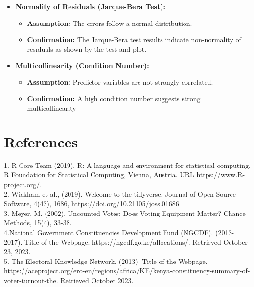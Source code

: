 \documentclass[fleqn,a4paper,12pt]{article}
\begin{document}
\begin{itemize}
\item \textbf{Normality of Residuals (Jarque-Bera Test):}
   \begin{itemize}
   \item \textbf{Assumption:} The errors follow a normal distribution.
   \item \textbf{Confirmation:} The Jarque-Bera test results indicate non-normality of residuals as shown by the test and plot.
   \end{itemize}

\item \textbf{Multicollinearity (Condition Number):}
   \begin{itemize}
   \item \textbf{Assumption:} Predictor variables are not strongly correlated.
   \item \textbf{Confirmation:} A high condition number suggests strong multicollinearity
\end{itemize}
\end{itemize}

\newpage

\section{References}
  \leftskip 0.1in
  \parindent -0.1in
1. R Core Team (2019). R: A language and environment for statistical computing. R Foundation for Statistical Computing, Vienna, Austria. URL https://www.R-project.org/.\\
 2. Wickham et al., (2019). Welcome to the tidyverse. Journal of Open Source Software, 4(43), 1686, https://doi.org/10.21105/joss.01686 \\
3. Meyer, M. (2002). Uncounted Votes: Does Voting Equipment Matter? Chance Methods, 15(4), 33-38.\\
4.National Government Constituencies Development Fund (NGCDF). (2013-2017). Title of the Webpage. https://ngcdf.go.ke/allocations/. Retrieved October 23, 2023.\\
 5. The Electoral Knowledge Network. (2013). Title of the Webpage. https://aceproject.org/ero-en/regions/africa/KE/kenya-constituency-summary-of-voter-turnout-the. Retrieved October 2023.
\end{document}
